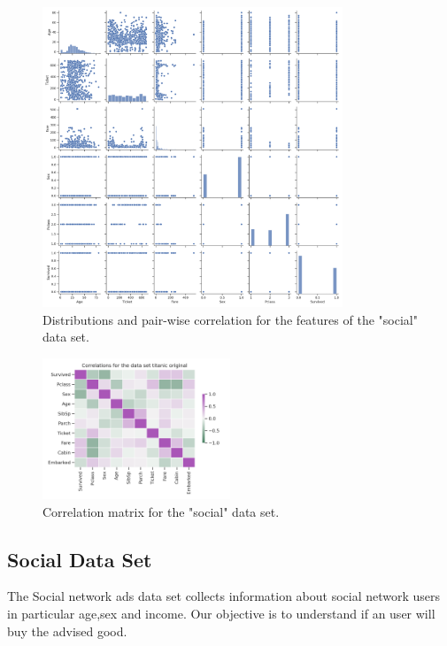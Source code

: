 \documentclass{article}
\begin{document}
\begin{figure}[h!]
	\centering
	\includegraphics[width=0.8\textwidth]{../plots/titanic_pairplot_reduced_original.png}
	\caption{ Distributions and pair-wise correlation for the features of the "social" data set.}
	\label{pairplot_income}
\end{figure}


\begin{figure}[h!]
	\centering
	\includegraphics[width=0.5\textwidth]{../plots/titanic_correlations_original.png}
	\caption{Correlation matrix for the "social" data set. }
	\label{correlation_income}
\end{figure}


\clearpage
\subsection{Social Data Set}
The Social network ads data set \cite{social} collects information about social network users in particular age,sex and income. Our objective is to understand if an user will buy the advised good.
\end{document}
